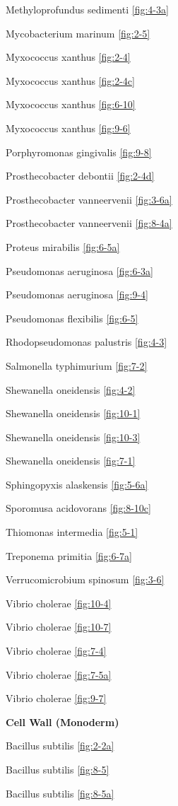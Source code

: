 \documentclass[]{tufte-book}
\begin{document}
Methyloprofundus sedimenti \ref{fig:4-3a}

Mycobacterium marinum \ref{fig:2-5}

Myxococcus xanthus \ref{fig:2-4}

Myxococcus xanthus \ref{fig:2-4c}

Myxococcus xanthus \ref{fig:6-10}

Myxococcus xanthus \ref{fig:9-6}

Porphyromonas gingivalis \ref{fig:9-8}

Prosthecobacter debontii \ref{fig:2-4d}

Prosthecobacter vanneervenii \ref{fig:3-6a}

Prosthecobacter vanneervenii \ref{fig:8-4a}

Proteus mirabilis \ref{fig:6-5a}

Pseudomonas aeruginosa \ref{fig:6-3a}

Pseudomonas aeruginosa \ref{fig:9-4}

Pseudomonas flexibilis \ref{fig:6-5}

Rhodopseudomonas palustris \ref{fig:4-3}

Salmonella typhimurium \ref{fig:7-2}

Shewanella oneidensis \ref{fig:4-2}

Shewanella oneidensis \ref{fig:10-1}

Shewanella oneidensis \ref{fig:10-3}

Shewanella oneidensis \ref{fig:7-1}

Sphingopyxis alaskensis \ref{fig:5-6a}

Sporomusa acidovorans \ref{fig:8-10c}

Thiomonas intermedia \ref{fig:5-1}

Treponema primitia \ref{fig:6-7a}

Verrucomicrobium spinosum \ref{fig:3-6}

Vibrio cholerae \ref{fig:10-4}

Vibrio cholerae \ref{fig:10-7}

Vibrio cholerae \ref{fig:7-4}

Vibrio cholerae \ref{fig:7-5a}

Vibrio cholerae \ref{fig:9-7}

\textbf{Cell Wall (Monoderm)}

Bacillus subtilis \ref{fig:2-2a}

Bacillus subtilis \ref{fig:8-5}

Bacillus subtilis \ref{fig:8-5a}
\end{document}
